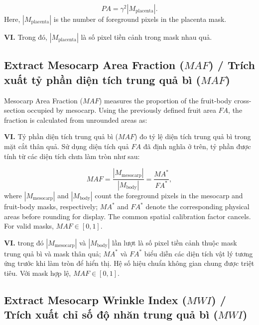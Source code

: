 \documentclass[final,1p,11pt,longtitle]{elsarticle}
\newenvironment{viet}{\par\smallskip\begingroup\color{viColor}\noindent\textbf{VI. }\ignorespaces}{\par\endgroup\smallskip}
\begin{document}
\begin{equation}
 PA=\gamma^2|M_{\mathrm{placenta}}|.
\end{equation}
Here, $|M_{\mathrm{placenta}}|$ is the number of foreground pixels in the placenta mask.

\begin{viet}
Trong đó, $|M_{\mathrm{placenta}}|$ là số pixel tiền cảnh trong mask nhau quả.
\end{viet}


\subsection*{Extract Mesocarp Area Fraction ($MAF$) / {\color{viColor} Trích xuất tỷ phần diện tích trung quả bì ($MAF$)}}

Mesocarp Area Fraction ($MAF$) measures the proportion of the fruit-body cross-section occupied by mesocarp. Using the previously defined fruit area $FA$, the fraction is calculated from unrounded areas as:

\begin{viet}
Tỷ phần diện tích trung quả bì ($MAF$) đo tỷ lệ diện tích trung quả bì trong mặt cắt thân quả. Sử dụng diện tích quả $FA$ đã định nghĩa ở trên, tỷ phần được tính từ các diện tích chưa làm tròn như sau:
\end{viet}

\begin{equation}
 MAF=\frac{|M_{\mathrm{mesocarp}}|}{|M_{\mathrm{body}}|}=\frac{MA^*}{FA^*},
\end{equation}
where $|M_{\mathrm{mesocarp}}|$ and $|M_{\mathrm{body}}|$ count the foreground pixels in the mesocarp and fruit-body masks, respectively; $MA^*$ and $FA^*$ denote the corresponding physical areas before rounding for display. The common spatial calibration factor cancels. For valid masks, $MAF\in[0,1]$.

\begin{viet}
trong đó $|M_{\mathrm{mesocarp}}|$ và $|M_{\mathrm{body}}|$ lần lượt là số pixel tiền cảnh thuộc mask trung quả bì và mask thân quả; $MA^*$ và $FA^*$ biểu diễn các diện tích vật lý tương ứng trước khi làm tròn để hiển thị. Hệ số hiệu chuẩn không gian chung được triệt tiêu. Với mask hợp lệ, $MAF\in[0,1]$.
\end{viet}



\subsection*{Extract Mesocarp Wrinkle Index ($MWI$) / {\color{viColor} Trích xuất chỉ số độ nhăn trung quả bì ($MWI$)}}
\end{document}
